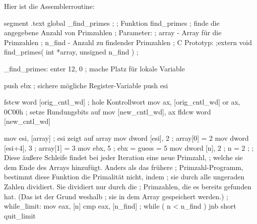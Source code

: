 Hier ist die Assemblerroutine:

\begin{AsmCodeListing}[label=prime2.asm, numbers=left, commandchars=\\\{\}]
 segment .text
 global  _find_primes
 ;
 ; Funktion find_primes
 ; finde die angegebene Anzahl von Primzahlen
 ; Parameter:
 ;   array  - Array f\"{u}r die Primzahlen
 ;   n_find - Anzahl zu findender Primzahlen
 ; C Prototyp:
 ;extern void find_primes( int *array, unsigned n_find )
 ;

 _find_primes:
         enter   12, 0               ; mache Platz f\"{u}r lokale Variable

         push    ebx                 ; sichere m\"{o}gliche Register-Variable
         push    esi

         fstcw   word [orig_cntl_wd] ; hole Kontrollwort
         mov     ax, [orig_cntl_wd]
         or      ax, 0C00h           ; setze Rundungsbits auf %
         mov     [new_cntl_wd], ax
         fldcw   word [new_cntl_wd]

         mov     esi, [array]        ; esi zeigt auf array
         mov     dword [esi], 2      ; array[0] = 2
         mov     dword [esi+4], 3    ; array[1] = 3
         mov     ebx, 5              ; ebx = guess = 5
         mov     dword [n], 2        ; n = 2
 ;
 ; Diese \"{a}u{\ss}ere Schleife findet bei jeder Iteration eine neue Primzahl,
 ; welche sie dem Ende des Arrays hinzuf\"{u}gt. Anders als das fr\"{u}here
 ; Primzahl-Programm, bestimmt diese Funktion die Primalit\"{a}t nicht, indem
 ; sie durch alle ungeraden Zahlen dividiert. Sie dividiert nur durch die
 ; Primzahlen, die es bereits gefunden hat. (Das ist der Grund weshalb
 ; sie in dem Array gespeichert werden.)
 ;
 while_limit:
         mov     eax, [n]
         cmp     eax, [n_find]       ; while ( n < n_find )
         jnb     short quit_limit


\end{AsmCodeListing}
